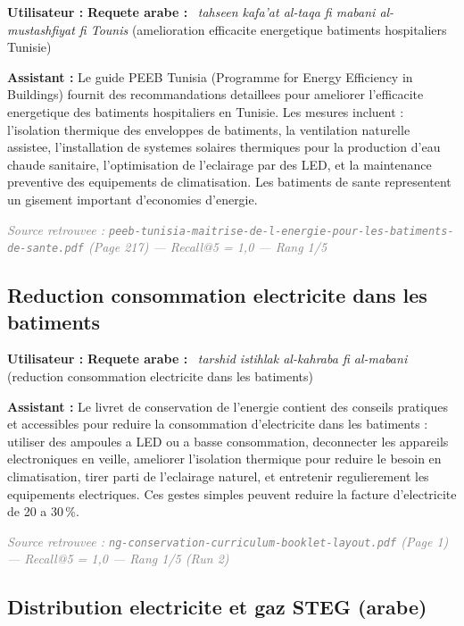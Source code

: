 \documentclass[12pt,a4paper,oneside]{article}
\newcommand{\prompt}[1]{%
  \noindent\colorbox{PromptBg}{\parbox{\dimexpr\linewidth-2\fboxsep}{%
    \small\textbf{\textcolor{MainBlue}{Utilisateur :}} #1%
  }}\vspace{3pt}%
}
\newcommand{\botreply}[1]{%
  \noindent\colorbox{OutputBg}{\parbox{\dimexpr\linewidth-2\fboxsep}{%
    \small\textbf{\textcolor{PassGreen!70!black}{Assistant :}} #1%
  }}\vspace{6pt}%
}
\begin{document}
\prompt{\textbf{Requete arabe :} ~\textit{tahseen kafa'at al-taqa fi mabani al-mustashfiyat fi Tounis} (amelioration efficacite energetique batiments hospitaliers Tunisie)}

\botreply{
Le guide PEEB Tunisia (Programme for Energy Efficiency in Buildings) fournit des recommandations detaillees pour ameliorer l'efficacite energetique des batiments hospitaliers en Tunisie. Les mesures incluent : l'isolation thermique des enveloppes de batiments, la ventilation naturelle assistee, l'installation de systemes solaires thermiques pour la production d'eau chaude sanitaire, l'optimisation de l'eclairage par des LED, et la maintenance preventive des equipements de climatisation. Les batiments de sante representent un gisement important d'economies d'energie.
}

\noindent\small\textit{\textcolor{gray}{Source retrouvee : \texttt{peeb-tunisia-maitrise-de-l-energie-pour-les-batiments-de-sante.pdf} (Page 217) --- Recall@5 = 1,0 --- Rang 1/5}}

\bigskip

\subsection{Reduction consommation electricite dans les batiments}

\prompt{\textbf{Requete arabe :} ~\textit{tarshid istihlak al-kahraba fi al-mabani} (reduction consommation electricite dans les batiments)}

\botreply{
Le livret de conservation de l'energie contient des conseils pratiques et accessibles pour reduire la consommation d'electricite dans les batiments : utiliser des ampoules a LED ou a basse consommation, deconnecter les appareils electroniques en veille, ameliorer l'isolation thermique pour reduire le besoin en climatisation, tirer parti de l'eclairage naturel, et entretenir regulierement les equipements electriques. Ces gestes simples peuvent reduire la facture d'electricite de 20 a 30\,\%.
}

\noindent\small\textit{\textcolor{gray}{Source retrouvee : \texttt{ng-conservation-curriculum-booklet-layout.pdf} (Page 1) --- Recall@5 = 1,0 --- Rang 1/5 (Run 2)}}

\bigskip

\subsection{Distribution electricite et gaz STEG (arabe)}
\end{document}
